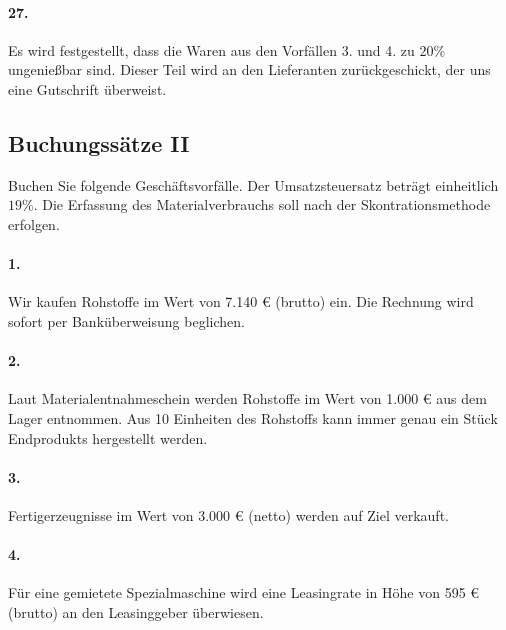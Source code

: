 \documentclass[paper=a4, fontsize=11pt]{scrartcl}
\numberwithin{equation}{section}
\numberwithin{figure}{section}
\numberwithin{table}{section}
\begin{document}
{\paragraph{27.}

Es wird festgestellt, dass die Waren aus den Vorfällen 3. und 4. zu $20 \%$  ungenießbar sind. Dieser Teil wird an den Lieferanten zurückgeschickt, der uns eine Gutschrift überweist. \\


\subsection{Buchungssätze II}

Buchen Sie folgende Geschäftsvorfälle. Der Umsatzsteuersatz beträgt einheitlich $19 \%$. Die Erfassung des Materialverbrauchs soll nach der Skontrationsmethode erfolgen. \\

\paragraph{1.}

Wir kaufen Rohstoffe im Wert von 7.140 € (brutto) ein. Die Rechnung wird sofort per Banküberweisung beglichen. \\

\paragraph{2.}

Laut Materialentnahmeschein werden Rohstoffe im Wert von 1.000 € aus dem Lager entnommen. Aus 10 Einheiten des Rohstoffs kann immer genau ein Stück Endprodukts hergestellt werden. \\

\paragraph{3.}

Fertigerzeugnisse im Wert von 3.000 € (netto) werden auf Ziel verkauft. \\

\paragraph{4.}

Für eine gemietete Spezialmaschine wird eine Leasingrate in Höhe von 595 € (brutto) an den Leasinggeber überwiesen. \\

}
\end{document}

